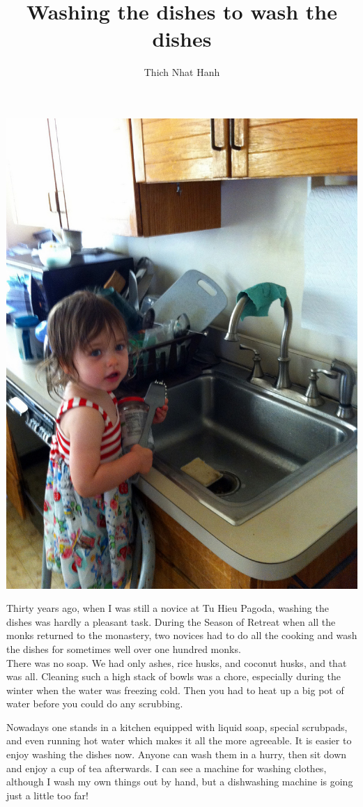 \documentclass[a4paper,12pt]{article}
\title{Washing the dishes to wash the dishes}
\author{Thich Nhat Hanh}
\begin{document}
 \maketitle
\begin{center}
\includegraphics[scale=0.25]{washingdishes.jpg}
\end{center}
Thirty years ago, when I was still a novice at Tu Hieu Pagoda, washing the 
dishes was hardly a pleasant task. During the Season of Retreat when all the 
monks returned to the monastery, two novices had to do all the cooking and wash 
the dishes for sometimes well over one hundred monks.
\\
There was no soap. We had only ashes, rice husks, and coconut husks, and that 
was all. Cleaning such a high stack of bowls was a chore, especially during the 
winter when the water was freezing cold. Then you had to heat up a big pot of 
water before you could do any scrubbing.

Nowadays one stands in a kitchen equipped with liquid soap, special scrubpads, 
and even running hot water which makes it all the more agreeable. It is easier 
to enjoy washing the dishes now. Anyone can wash them in a hurry, then sit down 
and enjoy a cup of tea afterwards. I can see a machine for washing clothes, 
although I wash my own things out by hand, but a dishwashing machine is going 
just a little too far!
\end{document}
